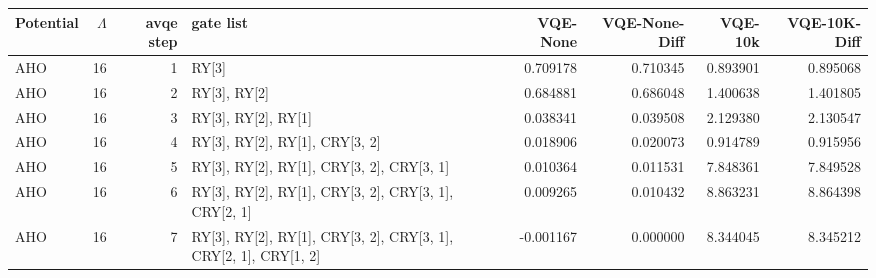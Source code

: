 \begin{tabular}{lrrlrrrr}
\toprule
Potential & $\Lambda$ & avqe step & gate list & VQE-None & VQE-None-Diff & VQE-10k & VQE-10K-Diff \\
\midrule
AHO & 16 & 1 & RY[3] & 0.709178 & 0.710345 & 0.893901 & 0.895068 \\
AHO & 16 & 2 & RY[3], RY[2] & 0.684881 & 0.686048 & 1.400638 & 1.401805 \\
AHO & 16 & 3 & RY[3], RY[2], RY[1] & 0.038341 & 0.039508 & 2.129380 & 2.130547 \\
AHO & 16 & 4 & RY[3], RY[2], RY[1], CRY[3, 2] & 0.018906 & 0.020073 & 0.914789 & 0.915956 \\
AHO & 16 & 5 & RY[3], RY[2], RY[1], CRY[3, 2], CRY[3, 1] & 0.010364 & 0.011531 & 7.848361 & 7.849528 \\
AHO & 16 & 6 & RY[3], RY[2], RY[1], CRY[3, 2], CRY[3, 1], CRY[2, 1] & 0.009265 & 0.010432 & 8.863231 & 8.864398 \\
AHO & 16 & 7 & RY[3], RY[2], RY[1], CRY[3, 2], CRY[3, 1], CRY[2, 1], CRY[1, 2] & -0.001167 & 0.000000 & 8.344045 & 8.345212 \\
\bottomrule
\end{tabular}
